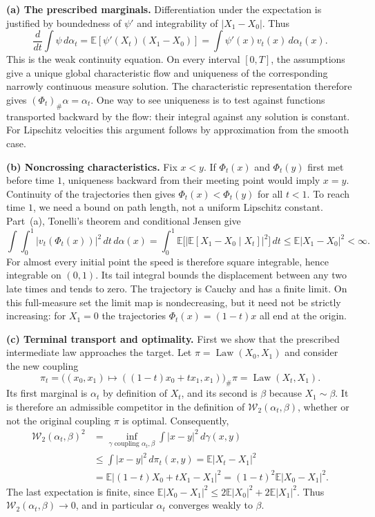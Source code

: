 \documentclass[11pt,a4paper]{article}
\theoremstyle{exostyle}
\newcommand{\push}{\#}
\newcommand{\Wtwo}{\mathcal{W}_2}
\newcommand{\EE}{\mathbb{E}}
\newcommand{\Law}{\operatorname{Law}}
\begin{document}
\begin{solution}
\textbf{(a) The prescribed marginals.}
Differentiation under the expectation is justified by boundedness of
$\psi'$ and integrability of $|X_1-X_0|$. Thus
\[
  \frac{d}{dt}\int\psi\,d\alpha_t
    =\EE[\psi'(X_t)(X_1-X_0)]
    =\int\psi'(x)v_t(x)\,d\alpha_t(x).
\]
This is the weak continuity equation. On every interval $[0,T]$, the
assumptions give a unique global characteristic flow and uniqueness
of the corresponding narrowly continuous measure solution. The
characteristic representation therefore gives
$(\Phi_t)_\push\alpha=\alpha_t$. One way to see uniqueness is to test
against functions transported backward by the flow: their integral
against any solution is constant. For Lipschitz velocities this
argument follows by approximation from the smooth case.

\textbf{(b) Noncrossing characteristics.}
Fix $x<y$. If $\Phi_t(x)$ and $\Phi_t(y)$ first met before time $1$,
uniqueness backward from their meeting point would imply $x=y$.
Continuity of the trajectories then gives $\Phi_t(x)<\Phi_t(y)$ for
all $t<1$. To reach time $1$, we need a bound on path length, not a
uniform Lipschitz constant. Part~(a), Tonelli's theorem and conditional
Jensen give
\[
 \int\!\int_0^1 |v_t(\Phi_t(x))|^2\,dt\,d\alpha(x)
 =\int_0^1\EE\bigl[|\EE[X_1-X_0\mid X_t]|^2\bigr]\,dt
 \le \EE|X_1-X_0|^2<\infty .
\]
For almost every initial point the speed is therefore square integrable,
hence integrable on $(0,1)$. Its tail integral bounds the displacement
between any two late times and tends to zero. The trajectory is Cauchy
and has a finite limit. On this full-measure set the limit map is
nondecreasing, but it need not be strictly increasing: for $X_1=0$
the trajectories $\Phi_t(x)=(1-t)x$ all end at the origin.

\textbf{(c) Terminal transport and optimality.}
First we show that the prescribed intermediate law approaches the target.
Let $\pi=\Law(X_0,X_1)$ and consider the new coupling
\[
  \pi_t=\bigl((x_0,x_1)\mapsto((1-t)x_0+tx_1,x_1)\bigr)_\push\pi
       =\Law(X_t,X_1).
\]
Its first marginal is $\alpha_t$ by definition of $X_t$, and its second
is $\beta$ because $X_1\sim\beta$. It is therefore an admissible
competitor in the definition of $\Wtwo(\alpha_t,\beta)$, whether or
not the original coupling $\pi$ is optimal. Consequently,
\begin{align*}
  \Wtwo(\alpha_t,\beta)^2
    &=\inf_{\gamma\text{ coupling }\alpha_t,\beta}
                       \int|x-y|^2\,d\gamma(x,y)\\
    &\leq\int|x-y|^2\,d\pi_t(x,y)
     =\EE|X_t-X_1|^2\\
    &=\EE|(1-t)X_0+tX_1-X_1|^2
     =(1-t)^2\EE|X_0-X_1|^2.
\end{align*}
The last expectation is finite, since
$\EE|X_0-X_1|^2\leq2\EE|X_0|^2+2\EE|X_1|^2$.
Thus $\Wtwo(\alpha_t,\beta)\to0$, and in particular
$\alpha_t$ converges weakly to $\beta$.


\end{solution}
\end{document}
